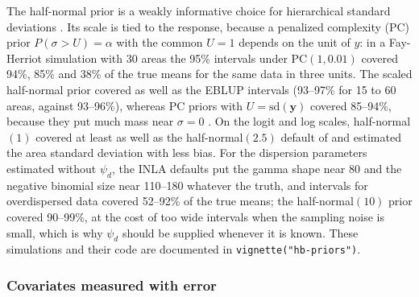 The half-normal prior is a weakly informative choice for hierarchical standard deviations \citep{gelman2006prior}. Its scale is tied to the response, because a penalized complexity (PC) prior \(P(\sigma > U) = \alpha\) \citep{simpson2017penalising} with the common \(U = 1\) depends on the unit of \(y\): in a Fay-Herriot simulation with 30 areas the 95\% intervals under PC\((1, 0.01)\) covered 94\%, 85\% and 38\% of the true means for the same data in three units. The scaled half-normal prior covered as well as the EBLUP intervals (93--97\% for 15 to 60 areas, against 93--96\%), whereas PC priors with \(U = \mathrm{sd}(\boldsymbol{y})\) covered 85--94\%, because they put much mass near \(\sigma = 0\) \citep{sorbye2014scaling}. On the logit and log scales, half-normal\((1)\) covered at least as well as the half-normal\((2.5)\) default of  and estimated the area standard deviation with less bias. For the dispersion parameters estimated without \(\psi_d\), the INLA defaults put the gamma shape near 80 and the negative binomial size near 110--180 whatever the truth, and intervals for overdispersed data covered 52--92\% of the true means; the half-normal\((10)\) prior covered 90--99\%, at the cost of too wide intervals when the sampling noise is small, which is why \(\psi_d\) should be supplied whenever it is known. These simulations and their code are documented in \texttt{vignette("hb-priors")}.

\subsubsection{Covariates measured with error}\label{sec:methods-me}

